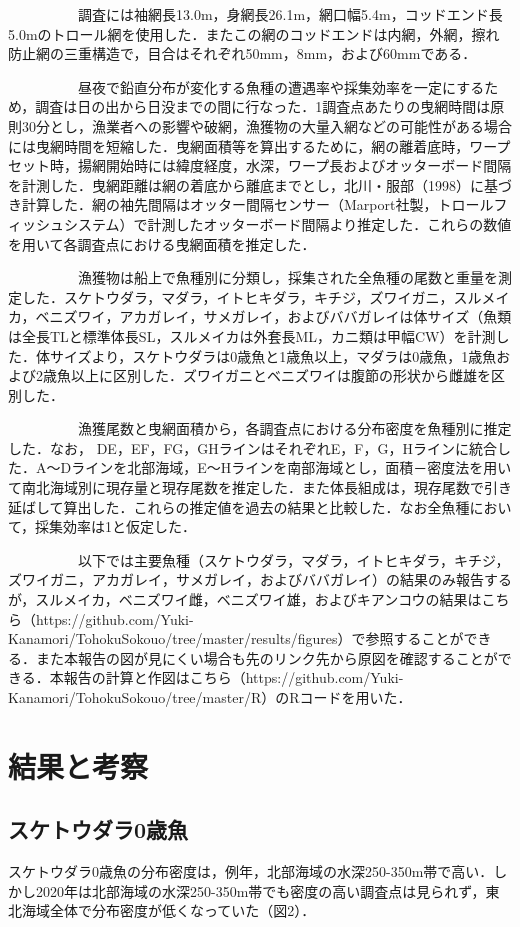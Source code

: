 \documentclass[11pt]{article} %
\begin{document}
\begin{linenumbers}
\ \ \ \ \ \ \ \ \ \ 
調査には袖網長13.0m，身網長26.1m，網口幅5.4m，コッドエンド長5.0mのトロール網を使用した．またこの網のコッドエンドは内網，外網，擦れ防止網の三重構造で，目合はそれぞれ50mm，8mm，および60mmである．

\ \ \ \ \ \ \ \ \ \ 
昼夜で鉛直分布が変化する魚種の遭遇率や採集効率を一定にするため，調査は日の出から日没までの間に行なった．1調査点あたりの曳網時間は原則30分とし，漁業者への影響や破網，漁獲物の大量入網などの可能性がある場合には曳網時間を短縮した．曳網面積等を算出するために，網の離着底時，ワープセット時，揚網開始時には緯度経度，水深，ワープ長およびオッターボード間隔を計測した．曳網距離は網の着底から離底までとし，北川・服部（1998）に基づき計算した．網の袖先間隔はオッター間隔センサー（Marport社製，トロールフィッシュシステム）で計測したオッターボード間隔より推定した．これらの数値を用いて各調査点における曳網面積を推定した．

\ \ \ \ \ \ \ \ \ \ 
漁獲物は船上で魚種別に分類し，採集された全魚種の尾数と重量を測定した．スケトウダラ，マダラ，イトヒキダラ，キチジ，ズワイガニ，スルメイカ，ベニズワイ，アカガレイ，サメガレイ，およびババガレイは体サイズ（魚類は全長TLと標準体長SL，スルメイカは外套長ML，カニ類は甲幅CW）を計測した．体サイズより，スケトウダラは0歳魚と1歳魚以上，マダラは0歳魚，1歳魚および2歳魚以上に区別した．ズワイガニとベニズワイは腹節の形状から雌雄を区別した．

\ \ \ \ \ \ \ \ \ \ 
漁獲尾数と曳網面積から，各調査点における分布密度を魚種別に推定した．なお， DE，EF，FG，GHラインはそれぞれE，F，G，Hラインに統合した．A～Dラインを北部海域，E～Hラインを南部海域とし，面積－密度法を用いて南北海域別に現存量と現存尾数を推定した．また体長組成は，現存尾数で引き延ばして算出した．これらの推定値を過去の結果と比較した．なお全魚種において，採集効率は1と仮定した．

\ \ \ \ \ \ \ \ \ \ 
以下では主要魚種（スケトウダラ，マダラ，イトヒキダラ，キチジ，ズワイガニ，アカガレイ，サメガレイ，およびババガレイ）の結果のみ報告するが，スルメイカ，ベニズワイ雌，ベニズワイ雄，およびキアンコウの結果はこちら（https://github.com/Yuki-Kanamori/TohokuSokouo/tree/master/results/figures）で参照することができる．また本報告の図が見にくい場合も先のリンク先から原図を確認することができる．本報告の計算と作図はこちら（https://github.com/Yuki-Kanamori/TohokuSokouo/tree/master/R）のRコードを用いた．

\section{結果と考察}
\subsection{スケトウダラ0歳魚}
スケトウダラ0歳魚の分布密度は，例年，北部海域の水深250-350m帯で高い．しかし2020年は北部海域の水深250-350m帯でも密度の高い調査点は見られず，東北海域全体で分布密度が低くなっていた（図2）．


\end{linenumbers}
\end{document}
